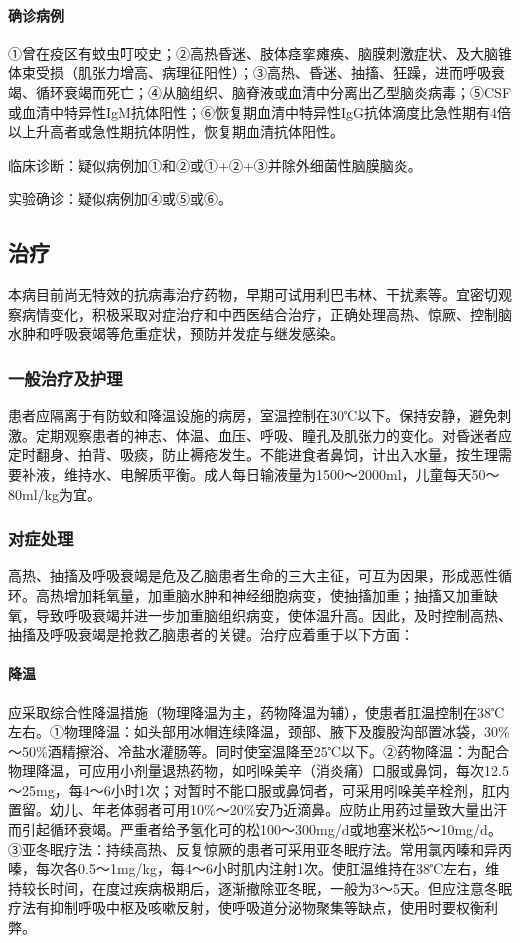 \paragraph{确诊病例}

①曾在疫区有蚊虫叮咬史；②高热昏迷、肢体痉挛瘫痪、脑膜刺激症状、及大脑锥体束受损（肌张力增高、病理征阳性）；③高热、昏迷、抽搐、狂躁，进而呼吸衰竭、循环衰竭而死亡；④从脑组织、脑脊液或血清中分离出乙型脑炎病毒；⑤CSF或血清中特异性IgM抗体阳性；⑥恢复期血清中特异性IgG抗体滴度比急性期有4倍以上升高者或急性期抗体阴性，恢复期血清抗体阳性。

临床诊断：疑似病例加①和②或①+②+③并除外细菌性脑膜脑炎。

实验确诊：疑似病例加④或⑤或⑥。

\subsection{治疗}

本病目前尚无特效的抗病毒治疗药物，早期可试用利巴韦林、干扰素等。宜密切观察病情变化，积极采取对症治疗和中西医结合治疗，正确处理高热、惊厥、控制脑水肿和呼吸衰竭等危重症状，预防并发症与继发感染。

\subsubsection{一般治疗及护理}

患者应隔离于有防蚊和降温设施的病房，室温控制在30℃以下。保持安静，避免刺激。定期观察患者的神志、体温、血压、呼吸、瞳孔及肌张力的变化。对昏迷者应定时翻身、拍背、吸痰，防止褥疮发生。不能进食者鼻饲，计出入水量，按生理需要补液，维持水、电解质平衡。成人每日输液量为1500～2000ml，儿童每天50～80ml/kg为宜。

\subsubsection{对症处理}

高热、抽搐及呼吸衰竭是危及乙脑患者生命的三大主征，可互为因果，形成恶性循环。高热增加耗氧量，加重脑水肿和神经细胞病变，使抽搐加重；抽搐又加重缺氧，导致呼吸衰竭并进一步加重脑组织病变，使体温升高。因此，及时控制高热、抽搐及呼吸衰竭是抢救乙脑患者的关键。治疗应着重于以下方面：

\paragraph{降温}

应采取综合性降温措施（物理降温为主，药物降温为辅），使患者肛温控制在38℃左右。①物理降温：如头部用冰帽连续降温，颈部、腋下及腹股沟部置冰袋，30\%～50\%酒精擦浴、冷盐水灌肠等。同时使室温降至25℃以下。②药物降温：为配合物理降温，可应用小剂量退热药物，如吲哚美辛（消炎痛）口服或鼻饲，每次12.5～25mg，每4～6小时1次；对暂时不能口服或鼻饲者，可采用吲哚美辛栓剂，肛内置留。幼儿、年老体弱者可用10\%～20\%安乃近滴鼻。应防止用药过量致大量出汗而引起循环衰竭。严重者给予氢化可的松100～300mg/d或地塞米松5～10mg/d。③亚冬眠疗法：持续高热、反复惊厥的患者可采用亚冬眠疗法。常用氯丙嗪和异丙嗪，每次各0.5～1mg/kg，每4～6小时肌内注射1次。使肛温维持在38℃左右，维持较长时间，在度过疾病极期后，逐渐撤除亚冬眠，一般为3～5天。但应注意冬眠疗法有抑制呼吸中枢及咳嗽反射，使呼吸道分泌物聚集等缺点，使用时要权衡利弊。

